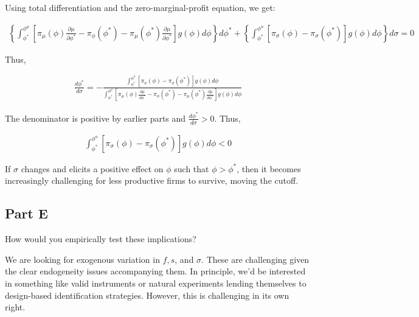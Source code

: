\documentclass[10pt]{article}
\begin{document}
Using total differentiation and the zero-marginal-profit equation, we get:

\begin{align}
    \left\{\int_{\phi^*}^{\phi^\mu}\left[\pi_\mu(\phi) \frac{\partial \mu}{\partial \phi^*}-\pi_\phi\left(\phi^*\right)-\pi_\mu\left(\phi^*\right) \frac{\partial \mu}{\partial \phi^*}\right] g(\phi) d \phi\right\} d \phi^*+\left\{\int_{\phi^*}^{\phi^u}\left[\pi_\sigma(\phi)-\pi_\sigma\left(\phi^*\right)\right] g(\phi) d \phi\right\} d \sigma=0
\end{align}

Thus, 

\begin{align}
    \frac{d \phi^*}{d \sigma}=-\frac{\int_{\phi^*}^{\phi^u}\left[\pi_\sigma(\phi)-\pi_\sigma\left(\phi^*\right)\right] g(\phi) d \phi}{\int_{\phi^*}^{\phi^\mu}\left[\pi_\mu(\phi) \frac{\partial \mu}{\partial \phi^*}-\pi_\phi\left(\phi^*\right)-\pi_\mu\left(\phi^*\right) \frac{\partial \mu}{\partial \phi^*}\right] g(\phi) d \phi}
\end{align}

The denominator is positive by earlier parts 
and $\frac{d \phi^*}{d \sigma}>0$. Thus, 

\begin{align}
    \int_{\phi^*}^{\phi^u}\left[\pi_\sigma(\phi)-\pi_\sigma\left(\phi^*\right)\right] g(\phi) d \phi< 0
\end{align}

If $\sigma$ changes and elicits a positive effect on $\phi$ such that $\phi > \phi^*$, then 
it becomes increasingly challenging for 
less productive firms to survive, moving the cutoff. 



\subsection{Part E}

How would you empirically test these implications?

\hrulefill\hspace{0.5em}\dotfill\hspace{0.5em}\hrulefill

We are looking for exogenous variation in 
$f, s$, and $\sigma$. These are challenging given the clear 
endogeneity issues accompanying them. In principle, 
we'd be interested in something like valid instruments or 
natural experiments lending themselves 
to design-based identification strategies. 
However, this is challenging in its own right.
\end{document}
